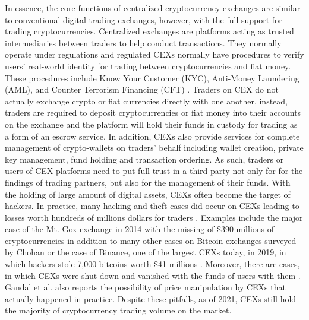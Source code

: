 In essence, the core functions of centralized cryptocurrency exchanges are similar to conventional digital trading exchanges, however, with the full support for trading cryptocurrencies. Centralized exchanges are platforms acting as trusted intermediaries between traders to help conduct transactions. They normally operate under regulations and regulated CEXs normally have procedures to verify users' real-world identity for trading between cryptocurrencies and fiat money. These procedures include Know Your Customer (KYC), Anti-Money Laundering (AML), and Counter Terrorism Financing (CFT) \cite{cryptopediaCEXState}. Traders on CEX do not actually exchange crypto or fiat currencies directly with one another, instead, traders are required to deposit cryptocurrencies or fiat money into their accounts on the exchange and the platform will hold their funds in custody for trading as a form of an escrow service. In addition, CEXs also provide services for complete management of crypto-wallets on traders' behalf including wallet creation, private key management, fund holding and transaction ordering. As such, traders or users of CEX platforms need to put full trust in a third party not only for for the findings of trading partners, but also for the management of their funds. With the holding of large amount of digital assets, CEXs often become the target of hackers. In practice, many hacking and theft cases did occur on CEXs leading to losses worth hundreds of millions dollars for traders \cite{cryptohack1718}. Examples include the major case of the Mt. Gox exchange in 2014 with the missing of \$390 millions of cryptocurrencies in addition to many other cases on Bitcoin exchanges surveyed by Chohan \cite{chohan2018problems} or the case of Binance, one of the largest CEXs today, in 2019, in which hackers stole 7,000 bitcoins worth \$41 millions \cite{binance2019hack}. Moreover, there are cases, in which CEXs were shut down and vanished with the funds of users with them \cite{moore2013beware}. Gandal et al. \cite{gandal2018price} also reports the possibility of price manipulation by CEXs that actually happened in practice. Despite these pitfalls, as of 2021, CEXs still hold the majority of cryptocurrency trading volume on the market. 

